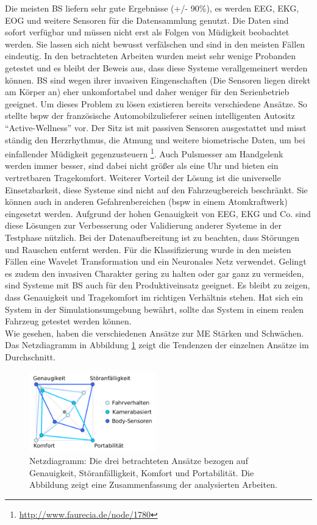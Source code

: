 {Die meisten \acl{BS} liefern sehr gute Ergebnisse (+/- 90\%), es werden EEG, EKG, EOG und weitere Sensoren für die Datensammlung genutzt. Die Daten sind sofort verfügbar und müssen nicht erst als Folgen von Müdigkeit beobachtet werden. Sie lassen sich nicht bewusst verfälschen und sind in den meisten Fällen eindeutig. In den betrachteten Arbeiten wurden meist sehr wenige Probanden getestet und es bleibt der Beweis aus, dass diese Systeme verallgemeinert werden können. \acl{BS} sind wegen ihrer invasiven Eingenschaften (Die Sensoren liegen direkt am Körper an) eher unkomfortabel und daher weniger für den Serienbetrieb geeignet. Um dieses Problem zu lösen existieren bereits verschiedene Ansätze. So stellte \acl{bspw} der französische Automobilzulieferer seinen intelligenten Autositz "`Active-Wellness"' vor. Der Sitz ist mit passiven Sensoren ausgestattet und misst ständig den Herzrhythmus, die Atmung und weitere biometrische Daten, um bei einfallender Müdigkeit gegenzusteuern \footnote{\url{http://www.faurecia.de/node/1780}}. Auch Pulsmesser am Handgelenk werden immer besser, sind dabei nicht größer als eine Uhr und bieten ein vertretbaren Tragekomfort. 
Weiterer Vorteil der Lösung ist die universelle Einsetzbarkeit, diese Systeme sind nicht auf den Fahrzeugbereich beschränkt. Sie können auch in anderen Gefahrenbereichen (\acl{bspw} in einem Atomkraftwerk) eingesetzt werden. Aufgrund der hohen Genauigkeit von EEG, EKG und Co. sind diese Lösungen zur Verbesserung oder Validierung anderer Systeme in der Testphase nützlich.
Bei der Datenaufbereitung ist zu beachten, dass Störungen und Rauschen entfernt werden. Für die Klassifizierung wurde in den meisten Fällen eine Wavelet Transformation und ein Neuronales Netz verwendet. Gelingt es zudem den invasiven Charakter gering zu halten oder gar ganz zu vermeiden, sind Systeme mit \acl{BS} auch für den Produktiveinsatz geeignet. Es bleibt zu zeigen, dass Genauigkeit und Tragekomfort im richtigen Verhältnis stehen. Hat sich ein System in der Simulationsumgebung bewährt, sollte das System in einem realen Fahrzeug getestet werden können.  \\

Wie gesehen, haben die verschiedenen Ansätze zur \acl{ME} Stärken und Schwächen. Das Netzdiagramm in Abbildung \ref{fig:analysis} zeigt die Tendenzen der einzelnen Ansätze im Durchschnitt.


\begin{figure}[h] 
  \begin{center}
    \includegraphics[width=5.5cm]{img/analysis}
    \caption{ Netzdiagramm: Die drei betrachteten Ansätze bezogen auf Genauigkeit, Störanfälligkeit, Komfort und Portabilität. Die Abbildung zeigt eine Zusammenfassung der analysierten Arbeiten.}
    \label{fig:analysis}
  \end{center}
\end{figure}

}
